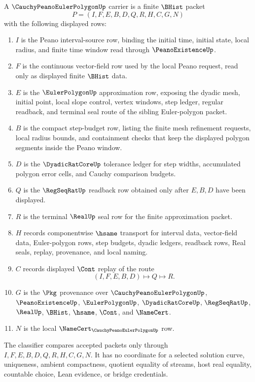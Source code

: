 \begin{definition}
\label{def:cauchy-peano-euler-polygon-carrier}
A $\CauchyPeanoEulerPolygonUp$ carrier is a finite $\BHist$ packet
$$
P=(I,F,E,B,D,Q,R,H,C,G,N)
$$
with the following displayed rows:
\begin{enumerate}
\item $I$ is the Peano interval-source row, binding the initial time, initial state, local radius, and finite time window read through $\PeanoExistenceUp$.
\item $F$ is the continuous vector-field row used by the local Peano request, read only as displayed finite $\BHist$ data.
\item $E$ is the $\EulerPolygonUp$ approximation row, exposing the dyadic mesh, initial point, local slope control, vertex windows, step ledger, regular readback, and terminal seal route of the sibling Euler-polygon packet.
\item $B$ is the compact step-budget row, listing the finite mesh refinement requests, local radius bounds, and containment checks that keep the displayed polygon segments inside the Peano window.
\item $D$ is the $\DyadicRatCoreUp$ tolerance ledger for step widths, accumulated polygon error cells, and Cauchy comparison budgets.
\item $Q$ is the $\RegSeqRatUp$ readback row obtained only after $E,B,D$ have been displayed.
\item $R$ is the terminal $\RealUp$ seal row for the finite approximation packet.
\item $H$ records componentwise $\hsame$ transport for interval data, vector-field data, Euler-polygon rows, step budgets, dyadic ledgers, readback rows, Real seals, replay, provenance, and local naming.
\item $C$ records displayed $\Cont$ replay of the route
$$
(I,F,E,B,D)\longmapsto Q\longmapsto R .
$$
\item $G$ is the $\Pkg$ provenance over $\CauchyPeanoEulerPolygonUp$, $\PeanoExistenceUp$, $\EulerPolygonUp$, $\DyadicRatCoreUp$, $\RegSeqRatUp$, $\RealUp$, $\BHist$, $\hsame$, $\Cont$, and $\NameCert$.
\item $N$ is the local $\NameCert_{\CauchyPeanoEulerPolygonUp}$ row.
\end{enumerate}
The classifier compares accepted packets only through $I,F,E,B,D,Q,R,H,C,G,N$. It has no coordinate for a selected solution curve, uniqueness, ambient compactness, quotient equality of streams, host real equality, countable choice, Lean evidence, or bridge credentials.
\end{definition}


